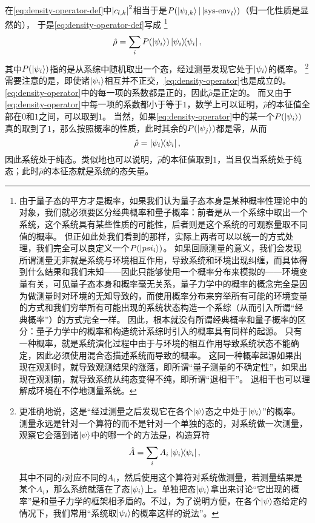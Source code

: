 \documentclass[hyperref, UTF8, a4paper]{ctexart}
\begin{document}
在\eqref{eq:density-operator-def}中$\abs{c_{l, k}}^2$相当于是$P(\ket{\psi_{l, k}}|\ket{\text{sys-env}_l})$（归一化性质是显然的），
于是\eqref{eq:density-operator-def}写成%
\footnote{由于量子态的平方才是概率，如果我们认为量子态本身是某种概率性理论中的对象，我们就必须要区分经典概率和量子概率：前者是从一个系综中取出一个系统，这个系统具有某些性质的可能性，后者则是这个系统的可观察量取不同值的概率。
但正如此处我们看到的那样，实际上两者可以以统一的方式处理，我们完全可以良定义一个$P(\ket{psi_i})$。
如果回顾测量的意义，我们会发现所谓测量无非就是系统与环境相互作用，导致系统和环境出现纠缠，而具体得到什么结果和我们未知——因此只能够使用一个概率分布来模拟的——环境变量有关，可见量子态本身和概率毫无关系，量子力学中的概率的概念完全是因为做测量时对环境的无知导致的，而使用概率分布来穷举所有可能的环境变量的方式和我们穷举所有可能出现的系统状态构造一个系综（从而引入所谓“经典概率”）的方式完全一样。
因此，根本就没有所谓经典概率和量子概率的区分：量子力学中的概率和构造统计系综时引入的概率具有同样的起源。
只有一种概率，就是系统演化过程中由于与环境的相互作用导致系统状态不能确定，因此必须使用混合态描述系统而导致的概率。
这同一种概率起源如果出现在观测时，就导致观测结果的涨落，即所谓“量子测量的不确定性”，如果出现在观测前，就导致系统从纯态变得不纯，即所谓“退相干”。
退相干也可以理解成环境在不停地测量系统。
}%
\begin{equation}
    \hat{\rho} = \sum_{i} P(\ket{\psi_i}) \dyad{\psi_i},
    \label{eq:density-operator}
\end{equation}
其中$P(\ket{\psi_i})$指的是从系综中随机取出一个态，经过测量发现它处于$\ket{\psi_i}$的概率。%
\footnote{更准确地说，这是“经过测量之后发现它在各个$\ket{\psi}$态之中处于$\ket{\psi_i}$”的概率。
测量永远是针对一个算符的而不是针对一个单独的态的，对系统做一次测量，观察它会落到诸$\ket{\psi}$中的哪一个的方法是，构造算符
\[
    \hat{A} = \sum_i A_i \dyad{\psi_i},
\]
其中不同的$i$对应不同的$A_i$，然后使用这个算符对系统做测量，若测量结果是某个$A_i$，那么系统就落在了态$\ket{\psi_i}$上。单独把态$\ket{\psi_i}$拿出来讨论“它出现的概率”是和量子力学的框架相矛盾的。不过，为了说明方便，在各个$\ket{\psi}$态给定的情况下，我们常用“系统取$\ket{\psi_i}$的概率这样的说法”。}%
需要注意的是，即使诸$\ket{\psi_i}$相互并不正交，\eqref{eq:density-operator}也是成立的。
\eqref{eq:density-operator}中的每一项的系数都是正的，因此$\hat{\rho}$是正定的。
而又由于\eqref{eq:density-operator}中每一项的系数都小于等于$1$，数学上可以证明，$\hat{\rho}$的本征值全部在$0$和$1$之间，可以取到$1$。
当然，如果\eqref{eq:density-operator}中的某一个$P(\ket{\psi_i})$真的取到了$1$，那么按照概率的性质，此时其余的$P(\ket{\psi_j})$都是零，从而
\[
    \hat{\rho} = \dyad{\psi_i},
\]
因此系统处于纯态。类似地也可以说明，$\hat{\rho}$的本征值取到$1$，当且仅当系统处于纯态；此时$\hat{\rho}$的本征态就是系统的态矢量。
\end{document}
